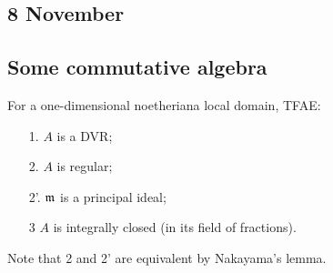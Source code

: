 \documentclass[11pt]{article}
\begin{document}
\begin{Nov8}
\section*{8 November}
\subsection*{Some commutative algebra}
\begin{prop*}
For a one-dimensional noetheriana local domain, TFAE:
\begin{enumerate}\squishlist
\item[1.] $A$ is a DVR;
\item[2.] $A$ is regular;
\item[2'.] $\mathfrak{m}$ is a principal ideal;
\item[3] $A$ is integrally closed (in its field of fractions).
\end{enumerate}
\end{prop*}
\noindent Note that 2 and 2' are equivalent by Nakayama's lemma.


\end{Nov8}
\end{document}
